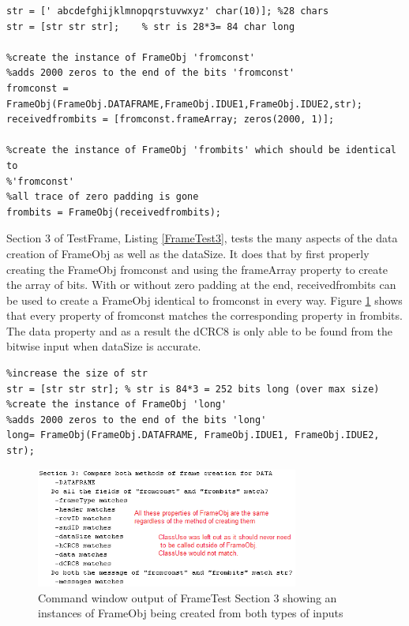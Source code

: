 \begin{lstlisting} 
str = [' abcdefghijklmnopqrstuvwxyz' char(10)]; %28 chars
str = [str str str];    % str is 28*3= 84 char long

%create the instance of FrameObj 'fromconst'
%adds 2000 zeros to the end of the bits 'fromconst'
fromconst = FrameObj(FrameObj.DATAFRAME,FrameObj.IDUE1,FrameObj.IDUE2,str);
receivedfrombits = [fromconst.frameArray; zeros(2000, 1)];

%create the instance of FrameObj 'frombits' which should be identical to
%'fromconst' 
%all trace of zero padding is gone
frombits = FrameObj(receivedfrombits);
\end{lstlisting} 

Section 3 of TestFrame, Listing \ref{FrameTest3}, tests the many aspects of the data creation of FrameObj as well as the dataSize. It does that by first properly creating the FrameObj fromconst and using the frameArray property to create the array of bits. With or without zero padding at the end, receivedfrombits can be used to create a FrameObj identical to fromconst in every way. Figure \ref{fig:FrameTest3} shows that every property of fromconst matches the corresponding property in frombits. The data property and as a result the dCRC8 is only able to be found from the bitwise input when dataSize is accurate.   

\begin{lstlisting} 
%increase the size of str
str = [str str str]; % str is 84*3 = 252 bits long (over max size)
%create the instance of FrameObj 'long'
%adds 2000 zeros to the end of the bits 'long'
long= FrameObj(FrameObj.DATAFRAME, FrameObj.IDUE1, FrameObj.IDUE2, str);
\end{lstlisting} 
\begin{figure}[ht]
    \includegraphics[width=0.77\textwidth]{FrameTest3.PNG}
    \caption{Command window output of FrameTest Section 3 showing an instances of FrameObj being created from both types of inputs }
    \label{fig:FrameTest3}
\end{figure}


